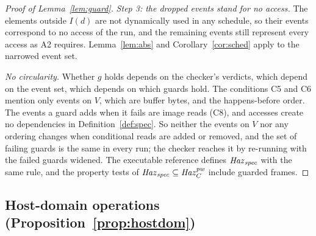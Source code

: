 \begin{proof}[Proof of Lemma~\ref{lem:guard}]
\emph{Step 3: the dropped events stand for no access.} The elements outside $I(d)$ are not dynamically used in any
schedule, so their events correspond to no access of the run, and the remaining events still represent every access
as A2 requires. Lemma~\ref{lem:abs} and Corollary~\ref{cor:sched} apply to the narrowed event set.

\emph{No circularity.} Whether $g$ holds depends on the checker's verdicts, which depend on the event set, which
depends on which guards hold. The conditions C5 and C6 mention only events on $V$, which are buffer bytes, and the
happens-before order. The events a guard adds when it fails are image reads (C8), and accesses create no dependencies
in Definition~\ref{def:spec}. So neither the events on $V$ nor any ordering changes when conditional reads are added or
removed, and the set of failing guards is the same in every run; the checker reaches it by re-running with the failed
guards widened. The executable reference defines $\mathit{Haz}_{\mathit{spec}}$ with the same rule, and the property tests of
$\mathit{Haz}_{\mathit{spec}} \subseteq \mathit{Haz}_C^{\mathit{pw}}$ include guarded frames.
\end{proof}

\subsection{Host-domain operations (Proposition~\ref{prop:hostdom})}
\label{app:hostdom}

